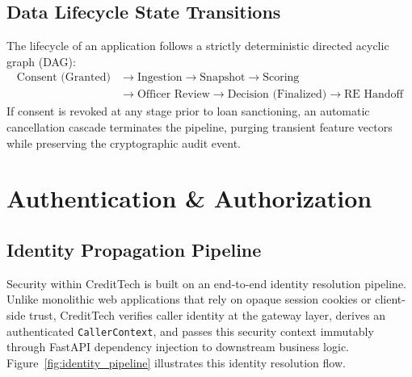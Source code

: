 \documentclass[11pt,a4paper,oneside]{report}
\begin{document}
\section{Data Lifecycle State Transitions}
The lifecycle of an application follows a strictly deterministic directed acyclic graph (DAG):
\begin{equation*}
  \begin{aligned}
    \text{Consent (Granted)} &\longrightarrow \text{Ingestion} \longrightarrow \text{Snapshot} \longrightarrow \text{Scoring} \\
    &\longrightarrow \text{Officer Review} \longrightarrow \text{Decision (Finalized)} \longrightarrow \text{RE Handoff}
  \end{aligned}
\end{equation*}
If consent is revoked at any stage prior to loan sanctioning, an automatic cancellation cascade terminates the pipeline, purging transient feature vectors while preserving the cryptographic audit event.




\chapter{Authentication \& Authorization}
\label{chap:auth}

\section{Identity Propagation Pipeline}
Security within CreditTech is built on an end-to-end identity resolution pipeline. Unlike monolithic web applications that rely on opaque session cookies or client-side trust, CreditTech verifies caller identity at the gateway layer, derives an authenticated \texttt{CallerContext}, and passes this security context immutably through FastAPI dependency injection to downstream business logic. Figure~\ref{fig:identity_pipeline} illustrates this identity resolution flow.
\end{document}
